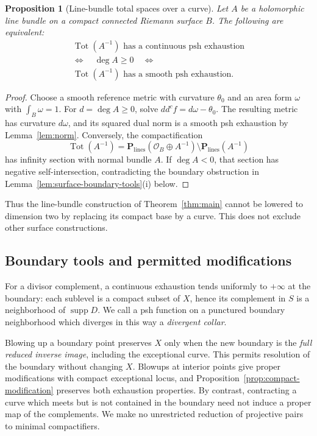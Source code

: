 \documentclass[11pt]{amsart}
\newtheorem{proposition}[theorem]{Proposition}
\theoremstyle{definition}
\theoremstyle{remark}
\numberwithin{equation}{section}
\newcommand{\PP}{\mathbf P}
\newcommand{\OO}{\mathcal O}
\newcommand{\Tot}{\operatorname{Tot}}
\newcommand{\ddc}{dd^c}
\newcommand{\supp}{\operatorname{supp}}
\begin{document}
\begin{proposition}[Line-bundle total spaces over a curve]
\label{cor:curve-total-space}
Let $A$ be a holomorphic line bundle on a compact connected Riemann
surface $B$. The following are equivalent:
\[
 \begin{gathered}
 \Tot(A^{-1})\text{ has a continuous psh exhaustion}\\
 \Longleftrightarrow\quad \deg A\ge0\quad\Longleftrightarrow\\
 \Tot(A^{-1})\text{ has a smooth psh exhaustion}.
 \end{gathered}
\]
\end{proposition}
\begin{proof}
Choose a smooth reference metric with curvature $\theta_0$ and an
area form $\omega$ with $\int_B\omega=1$. For $d=\deg A\ge0$, solve
$\ddc f=d\omega-\theta_0$. The resulting metric has curvature
$d\omega$, and its squared dual norm is a smooth psh exhaustion by
Lemma~\ref{lem:norm}. Conversely, the compactification
\[
 \Tot(A^{-1})=\PP_{\mathrm{lines}}(\OO_B\oplus A^{-1})
                 \setminus\PP_{\mathrm{lines}}(A^{-1})
\]
has infinity section with normal bundle $A$. If $\deg A<0$, that
section has negative self-intersection, contradicting the boundary
obstruction in Lemma~\ref{lem:surface-boundary-tools}\textup{(i)} below.
\end{proof}

Thus the line-bundle construction of Theorem~\ref{thm:main} cannot be
lowered to dimension two by replacing its compact base by a curve.
This does not exclude other surface constructions.

\subsection{Boundary tools and permitted modifications}
\label{sec:surface-pair-reduction}

For a divisor complement, a continuous exhaustion tends uniformly to
$+\infty$ at the boundary: each sublevel is a compact subset of $X$,
hence its complement in $S$ is a neighborhood of $\supp D$. We call a
psh function on a punctured boundary neighborhood which diverges in
this way a \emph{divergent collar}.

Blowing up a boundary point preserves $X$ only when the new boundary
is the \emph{full reduced inverse image}, including the exceptional
curve. This permits resolution of the boundary without changing $X$.
Blowups at interior points give proper modifications with compact
exceptional locus, and Proposition~\ref{prop:compact-modification}
preserves both exhaustion properties. By contrast, contracting a curve
which meets but is not contained in the boundary need not induce a
proper map of the complements. We make no unrestricted reduction of
projective pairs to minimal compactifiers.
\end{document}

